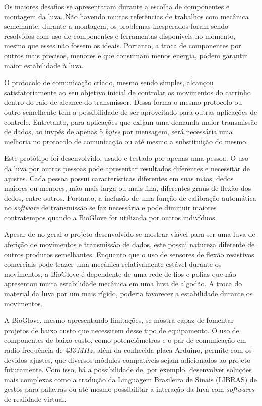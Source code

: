 \documentclass[
	12pt,				%
	openright,			%
	oneside,			%
	a4paper,			%
	english,			%
	brazil				%
	]{abntex2}
\begin{document}
		Os maiores desafios se apresentaram durante a escolha de componentes e montagem da luva. Não havendo muitas referências de trabalhos com mecânica semelhante, durante a montagem, os problemas inesperados foram sendo resolvidos com uso de componentes e ferramentas disponíveis no momento, mesmo que esses não fossem os ideais. Portanto, a troca de componentes por outros mais precisos, menores e que consumam menos energia, podem garantir maior estabilidade à luva.

		O protocolo de comunicação criado, mesmo sendo simples, alcançou satisfatoriamente ao seu objetivo inicial de controlar os movimentos do carrinho dentro do raio de alcance do transmissor. Dessa forma o mesmo protocolo ou outro semelhente tem a possibilidade de ser aproveitado para outras aplicações de controle. Entretanto, para aplicações que exijam uma demanda maior transmissão de dados, ao invpés de apenas 5 \textit{bytes} por mensagem, será necessária uma melhoria no protocolo de comunicação ou até mesmo a substituição do mesmo.

		Este protótipo foi desenvolvido, usado e testado por apenas uma pessoa. O uso da luva por outras pessoas pode apresentar resultados diferentes e necessitar de ajustes. Cada pessoa possui características diferentes em suas mãos, dedos maiores ou menores, mão mais larga ou mais fina, diferentes graus de flexão dos dedos, entre outros. Portanto, a inclusão de uma função de calibração automática no \textit{software} de transmissão se faz necessária e pode diminuir maiores contratempos quando a BioGlove for utilizada por outros indivíduos.


		Apesar de no geral o projeto desenvolvido se mostrar viável para ser uma luva de aferição de movimentos e transmissão de dados, este possui natureza diferente de outros produtos semelhantes. Enquanto que o uso de sensores de flexão resistivos comerciais pode trazer uma mecânica relativamente estável durante os movimentos, a BioGlove é dependente de uma rede de fios e polias que não apresentou muita estabilidade mecânica em uma luva de algodão. A troca do material da luva por um  mais rígido, poderia favorecer a estabilidade durante os movimentos.

		A BioGlove, mesmo apresentando limitações, se mostra capaz de fomentar projetos de baixo custo que necessitem desse tipo de equipamento. O uso de componentes de baixo custo, como potenciômetros e o par de comunicação em rádio frequência de 433$\,MHz$, além da conhecida placa Arduino, permite com os devidos ajustes, que diversos módulos compatíveis sejam adicionados ao projeto futuramente. Com isso, há a possibilidade de, por exemplo, desenvolver soluções mais complexas como a tradução da Linguagem Brasileira de Sinais (LIBRAS) de gestos para palavras ou até mesmo possibilitar a interação da luva com \textit{softwares} de realidade virtual.
\end{document}
